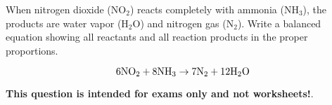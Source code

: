

When nitrogen dioxide (NO$_{2}$) reacts completely with ammonia (NH$_{3}$), the products are water vapor (H$_{2}$O) and nitrogen gas (N$_{2}$).  Write a balanced equation showing all reactants and all reaction products in the proper proportions.







$$6\hbox{NO}_2 + 8\hbox{NH}_3 \to 7\hbox{N}_2 + 12\hbox{H}_2\hbox{O}$$







{\bf This question is intended for exams only and not worksheets!}.



